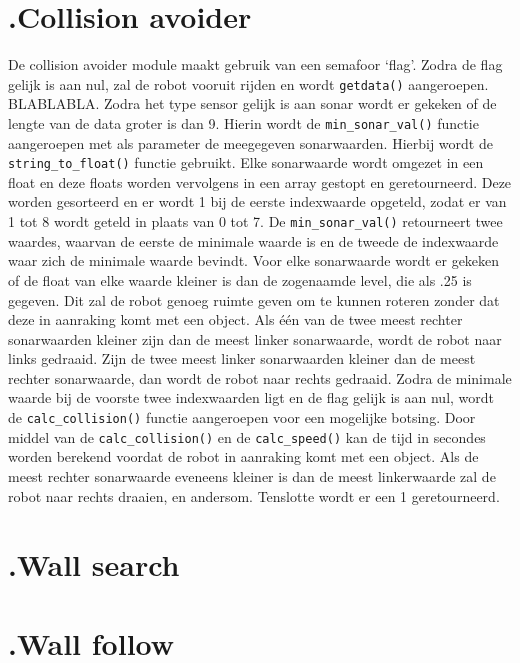 \documentclass[a4paper,10pt]{article}
\begin{document}
\section*{\label{collisionavoider}\thesection.\quad Collision avoider}
De collision avoider module maakt gebruik van een semafoor `flag'. Zodra de flag gelijk is aan nul, zal de robot vooruit rijden en wordt \verb!getdata()! aangeroepen. BLABLABLA. Zodra het type sensor gelijk is aan sonar wordt er gekeken of de lengte van de data groter is dan 9. Hierin wordt de \verb!min_sonar_val()! functie aangeroepen met als parameter de meegegeven sonarwaarden. Hierbij wordt de \verb!string_to_float()! functie gebruikt. Elke sonarwaarde wordt omgezet in een float en deze floats worden vervolgens in een array gestopt en geretourneerd. Deze worden gesorteerd en er wordt 1 bij de eerste indexwaarde opgeteld, zodat er van 1 tot 8 wordt geteld in plaats van 0 tot 7. De \verb!min_sonar_val()! retourneert twee waardes, waarvan de eerste de minimale waarde is en de tweede de indexwaarde waar zich de minimale waarde bevindt.
Voor elke sonarwaarde wordt er gekeken of de float van elke waarde kleiner is dan de zogenaamde level, die als .25 is gegeven. Dit zal de robot genoeg ruimte geven om te kunnen roteren zonder dat deze in aanraking komt met een object. Als \'{e}\'{e}n van de twee meest rechter sonarwaarden kleiner zijn dan de meest linker sonarwaarde, wordt de robot naar links gedraaid. Zijn de twee meest linker sonarwaarden kleiner dan de meest rechter sonarwaarde, dan wordt de robot naar rechts gedraaid. Zodra de minimale waarde bij de voorste twee indexwaarden ligt en de flag gelijk is aan nul, wordt de \verb!calc_collision()! functie aangeroepen voor een mogelijke botsing. Door middel van de \verb!calc_collision()! en de \verb!calc_speed()! kan de tijd in secondes worden berekend voordat de robot in aanraking komt met een object. Als de meest rechter sonarwaarde eveneens kleiner is dan de meest linkerwaarde zal de robot naar rechts draaien, en andersom. Tenslotte wordt er een 1 geretourneerd.

\section*{\label{wallsearch}\thesection.\quad Wall search}

\section*{\label{wallfollow}\thesection.\quad Wall follow}
\end{document}
